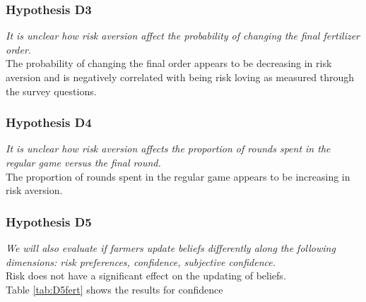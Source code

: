 \documentclass[12pt,letterpaper]{article}
\begin{document}


\newpage
\subsubsection*{Hypothesis D3}
\textit{It is unclear how risk aversion affect the probability of changing the final fertilizer order.} \\
The probability of changing the final order appears to be decreasing in risk aversion and is negatively correlated with being risk loving as measured through the survey questions.


\subsubsection*{Hypothesis D4}
\textit{It is unclear how risk aversion affects the proportion of rounds spent in the regular game versus the final round.} \\
The proportion of rounds spent in the regular game appears to be increasing in risk aversion.



\newpage

\subsubsection*{Hypothesis D5}
\textit{We will also evaluate if farmers update beliefs differently along the following dimensions: risk preferences, confidence, subjective confidence.}\\
Risk does not have a significant effect on the updating of beliefs. \\
Table \ref{tab:D5fert} shows the results for confidence




\end{document}
